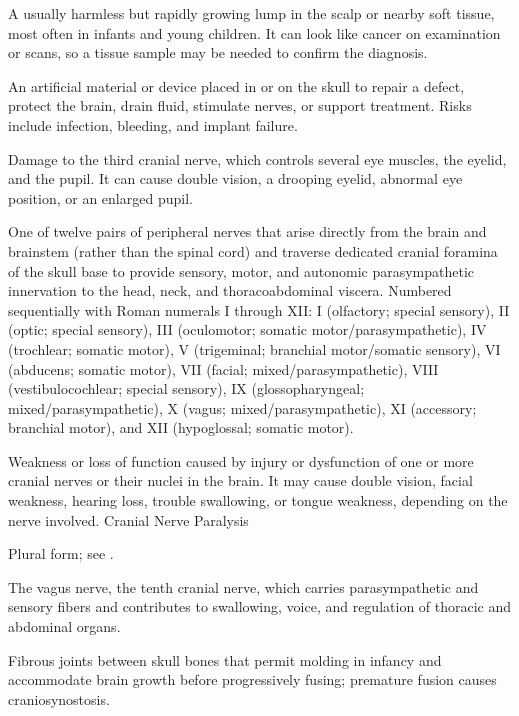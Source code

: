  A usually harmless but rapidly growing lump in the scalp or nearby soft tissue, most often in infants and young children. It can look like cancer on examination or scans, so a tissue sample may be needed to confirm the diagnosis.

 An artificial material or device placed in or on the skull to repair a defect, protect the brain, drain fluid, stimulate nerves, or support treatment. Risks include infection, bleeding, and implant failure.

 Damage to the third cranial nerve, which controls several eye muscles, the eyelid, and the pupil. It can cause double vision, a drooping eyelid, abnormal eye position, or an enlarged pupil.

 One of twelve pairs of peripheral nerves that arise directly from the brain and brainstem (rather than the spinal cord) and traverse dedicated cranial foramina of the skull base to provide sensory, motor, and autonomic parasympathetic innervation to the head, neck, and thoracoabdominal viscera. Numbered sequentially with Roman numerals I through XII: I (olfactory; special sensory), II (optic; special sensory), III (oculomotor; somatic motor/parasympathetic), IV (trochlear; somatic motor), V (trigeminal; branchial motor/somatic sensory), VI (abducens; somatic motor), VII (facial; mixed/parasympathetic), VIII (vestibulocochlear; special sensory), IX (glossopharyngeal; mixed/parasympathetic), X (vagus; mixed/parasympathetic), XI (accessory; branchial motor), and XII (hypoglossal; somatic motor).

 Weakness or loss of function caused by injury or dysfunction of one or more cranial nerves or their nuclei in the brain. It may cause double vision, facial weakness, hearing loss, trouble swallowing, or tongue weakness, depending on the nerve involved.
\synonyms
Cranial Nerve Paralysis

 Plural form; see .

 The vagus nerve, the tenth cranial nerve, which carries parasympathetic and sensory fibers and contributes to swallowing, voice, and regulation of thoracic and abdominal organs.

 Fibrous joints between skull bones that permit molding in infancy and accommodate brain growth before progressively fusing; premature fusion causes craniosynostosis.

